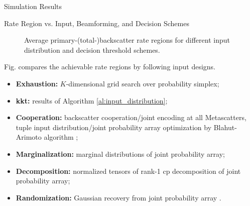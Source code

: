 \documentclass[journal]{IEEEtran}
\begin{document}
\begin{section}{Simulation Results}
	\begin{subsection}{Rate Region vs. Input, Beamforming, and Decision Schemes}
		\begin{figure}[!t]
			\centering
			\caption{Average primary-(total-)backscatter rate regions for different input distribution and decision threshold schemes.}
		\end{figure}
		Fig.  compares the achievable rate regions by following input designs.
		\begin{itemize}
			\item \textbf{Exhaustion:} $K$-dimensional grid search over probability simplex;
			\item \textbf{\gls{kkt}:} results of Algorithm \ref{al:input_distribution};
			\item \textbf{Cooperation:} backscatter cooperation/joint encoding at all Metascatters, tuple input distribution/joint probability array optimization by Blahut-Arimoto algorithm \cite{Arimoto1972,Blahut1972a};
			\item \textbf{Marginalization:} marginal distributions of joint probability array;
			\item \textbf{Decomposition:} normalized tensors of rank-1 \gls{cp} decomposition of joint probability array;
			\item \textbf{Randomization:} Gaussian recovery from joint probability array \cite{Calvo2010}.
		\end{itemize}


\end{subsection}
\end{section}
\end{document}
